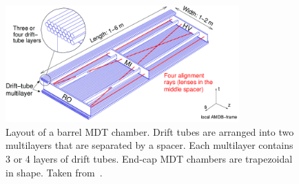 \begin{figure}[htp]
    \centering
    \includegraphics[width=0.8\textwidth]{figures/atlas/atlas_mdt_drifttube.png}
    \caption{Layout of a barrel MDT chamber. Drift tubes are arranged into two multilayers that are separated by a spacer. Each multilayer contains 3 or 4 layers of drift tubes. End-cap MDT chambers are trapezoidal in shape. Taken from~\cite{atlas_collaboration_paper}.}\label{fig:mdt_chamber}
\end{figure}